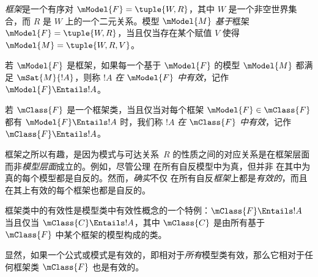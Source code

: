 \documentclass[../../../include/open-logic-section]{subfiles}
\begin{document}


\begin{defn}
  \emph{框架}是一个有序对 $\mModel{F} = \tuple{W,R}$，其中 $W$ 是一个非空世界集合，而 $R$ 是 $W$ 上的一个二元关系。模型 $\mModel{M}$ \emph{基于}框架 $\mModel{F} = \tuple{W,R}$，当且仅当存在某个赋值 $V$ 使得 $\mModel{M} = \tuple{W, R, V}$。
\end{defn}

\begin{defn}
  若 $\mModel{F}$ 是框架，如果每一个基于 $\mModel{F}$ 的模型 $\mModel{M}$ 都满足 $\mSat{M}{!A}$，则称 $!A$ \emph{在 $\mModel{F}$ 中有效}，记作 $\mModel{F} \Entails !A$。

  若 $\mClass{F}$ 是一个框架类，当且仅当对每个框架 $\mModel{F} \in \mClass{F}$ 都有 $\mModel{F} \Entails !A$ 时，我们称 $!A$ \emph{在 $\mClass{F}$ 中有效}，记作 $\mClass{F} \Entails !A$。
\end{defn}

框架之所以有趣，是因为模式与可达关系~$R$ 的性质之间的对应关系是在框架层面而非\emph{模型层面}成立的。例如，尽管公理  在所有自反模型中为真，但并非  在其中为真的每个模型都是自反的。然而，\emph{确实}不仅  在所有自反\emph{框架}上都是\emph{有效的}，而且  在其上有效的每个框架也都是自反的。

\begin{rem}
框架类中的有效性是模型类中有效性概念的一个特例：$\mClass{F} \Entails !A$ 当且仅当 $\mClass{C} \Entails !A$，其中 $\mClass{C}$ 是由所有基于 $\mClass{F}$ 中某个框架的模型构成的类。

显然，如果一个公式或模式是有效的，即相对于\emph{所有}模型类有效，那么它相对于任何框架类 $\mClass{F}$ 也是有效的。
\end{rem}
\end{document}
